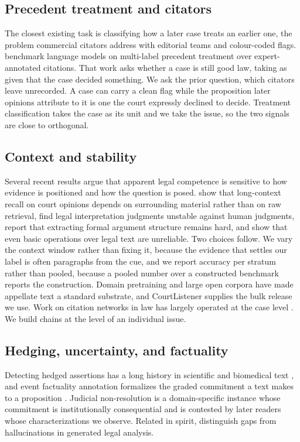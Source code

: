 \documentclass[11pt]{article}
\begin{document}
\subsection{Precedent treatment and citators} The closest existing task is
classifying how a later case treats an earlier one, the problem commercial
citators address with editorial teams and colour-coded flags.
\citet{demir2025validate} benchmark language models on multi-label precedent
treatment over expert-annotated citations. That work asks whether a case is still
good law, taking as given that the case decided something. We ask the prior
question, which citators leave unrecorded. A case can carry a clean flag while
the proposition later opinions attribute to it is one the court expressly
declined to decide. Treatment classification takes the case as its unit and we
take the issue, so the two signals are close to orthogonal.

\subsection{Context and stability} Several recent results argue that apparent
legal competence is sensitive to how evidence is positioned and how the question
is posed. \citet{xia2025haystack} show that long-context recall on court opinions
depends on surrounding material rather than on raw retrieval,
\citet{purushothama2025bench} find legal interpretation judgments unstable
against human judgments, \citet{held2025formal} report that extracting formal
argument structure remains hard, and \citet{blairstanek2024blt} show that even
basic operations over legal text are unreliable. Two choices follow. We vary the
context window rather than fixing it, because the evidence that settles our label
is often paragraphs from the cue, and we report accuracy per stratum rather than
pooled, because a pooled number over a constructed benchmark reports the
construction. Domain pretraining \citep{chalkidis2020legalbert} and large open
corpora \citep{henderson2022pile} have made appellate text a standard substrate,
and CourtListener \citep{cl} supplies the bulk release we use. Work on citation
networks in law has largely operated at the case level \citep{fowler2007network,
black2013citation}. We build chains at the level of an individual issue.

\subsection{Hedging, uncertainty, and factuality} Detecting hedged assertions has
a long history in scientific and biomedical text \citep{farkas2010conll,
vincze2008bioscope}, and event factuality annotation formalizes the graded
commitment a text makes to a proposition \citep{sauri2009factbank,
rudinger2018neural}. Judicial non-resolution is a domain-specific instance whose
commitment is institutionally consequential and is contested by later readers
whose characterizations we observe. Related in spirit, \citet{hou2024gaps}
distinguish gaps from hallucinations in generated legal analysis.
\end{document}
